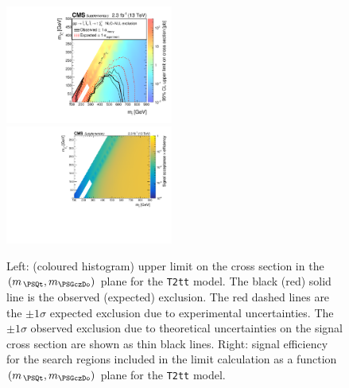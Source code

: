\clearpage
\begin{figure}[!h]
  \begin{center}
    \includegraphics[width=0.49\textwidth]{Supplementary/GenMetXSEC_aux} \, %
    \includegraphics[width=0.49\textwidth]{Supplementary/T2tt_merging_4_cats_aux} \,     
  \end{center}
  \caption{Left: (coloured histogram) upper limit on the cross section in the $(m_{\,\PSQt}, m_{\PSGczDo})$ plane for the \texttt{T2tt} model. 
  The black (red) solid line is the observed (expected) exclusion. The red dashed lines are the $\pm1\sigma$ expected exclusion due to experimental uncertainties. 
  The $\pm1\sigma$ observed exclusion due to theoretical uncertainties on the signal cross section are shown as thin black lines. 
  Right: signal efficiency for the search regions included in the limit calculation as a function $(m_{\,\PSQt}, m_{\PSGczDo})$ plane for the \texttt{T2tt} model. 
  \label{fig:T2tt_excl}}
\end{figure}


